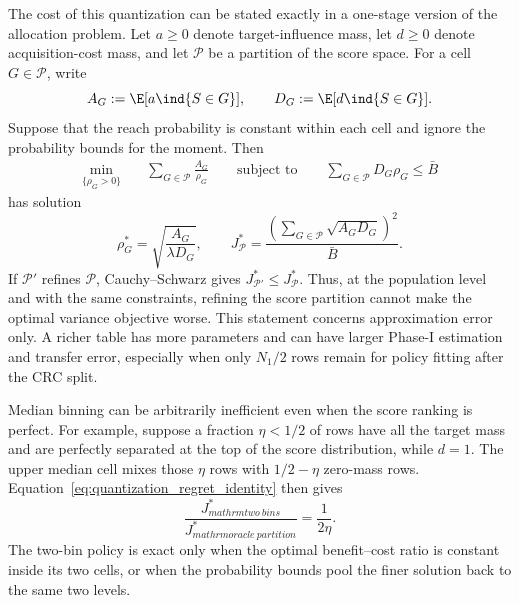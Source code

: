 The cost of this quantization can be stated exactly in a one-stage version of
the allocation problem.  Let $a\geq0$ denote target-influence mass, let
$d\geq0$ denote acquisition-cost mass, and let $\mathcal P$ be a partition of
the score space.  For a cell $G\in\mathcal P$, write
\begin{equation}
    A_G:=\E[a\ind{S\in G}],
    \qquad
    D_G:=\E[d\ind{S\in G}].
\end{equation}
Suppose that the reach probability is constant within each cell and ignore
the probability bounds for the moment.  Then
\begin{equation}
\begin{split}
    \min_{\{\rho_G>0\}}
    &\quad \sum_{G\in\mathcal P}\frac{A_G}{\rho_G}
    \qquad
    \text{subject to}\qquad
    \sum_{G\in\mathcal P}D_G\rho_G\leq \bar B
\end{split}
\label{eq:quantized_neyman_problem}
\end{equation}
has solution
\begin{equation}
    \rho_G^*=\sqrt{\frac{A_G}{\lambda D_G}},
    \qquad
    J_{\mathcal P}^*
    =\frac{\left(\sum_{G\in\mathcal P}\sqrt{A_GD_G}\right)^2}
    {\bar B}.
    \label{eq:quantization_regret_identity}
\end{equation}
If $\mathcal P'$ refines $\mathcal P$, Cauchy--Schwarz gives
$J_{\mathcal P'}^*\leq J_{\mathcal P}^*$.  Thus, at the population level and
with the same constraints, refining the score partition cannot make the
optimal variance objective worse.  This statement concerns approximation
error only.  A richer table has more parameters and can have larger Phase-I
estimation and transfer error, especially when only $N_1/2$ rows remain for
policy fitting after the CRC split.

Median binning can be arbitrarily inefficient even when the score ranking is
perfect.  For example, suppose a fraction $\eta<1/2$ of rows have all the
target mass and are perfectly separated at the top of the score distribution,
while $d=1$.  The upper median cell mixes those $\eta$ rows with
$1/2-\eta$ zero-mass rows.  Equation~\eqref{eq:quantization_regret_identity}
then gives
\begin{equation}
    \frac{J_{mathrm{two\ bins}}^*}{J_{mathrm{oracle\ partition}}^*}
    =\frac{1}{2\eta}.
\end{equation}
The two-bin policy is exact only when the optimal benefit--cost ratio is
constant inside its two cells, or when the probability bounds pool the finer
solution back to the same two levels.

